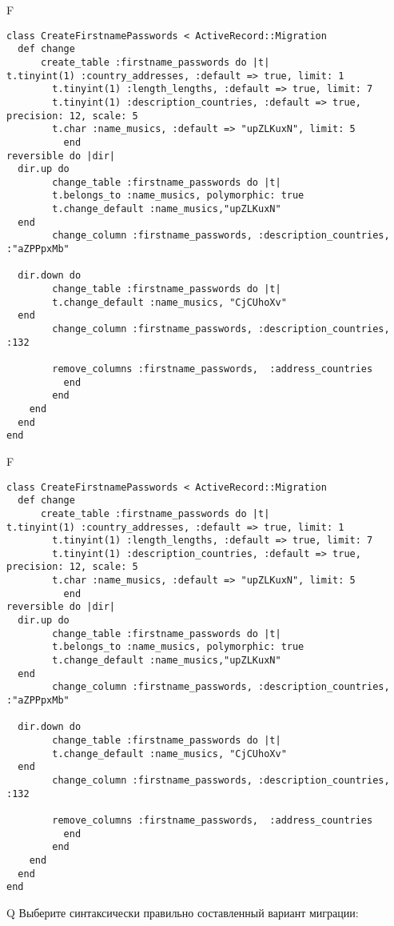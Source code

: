 F
\begin{verbatim}
class CreateFirstnamePasswords < ActiveRecord::Migration
  def change
	  create_table :firstname_passwords do |t|
t.tinyint(1) :country_addresses, :default => true, limit: 1
		t.tinyint(1) :length_lengths, :default => true, limit: 7
		t.tinyint(1) :description_countries, :default => true, precision: 12, scale: 5
		t.char :name_musics, :default => "upZLKuxN", limit: 5
		  end
reversible do |dir|
  dir.up do
		change_table :firstname_passwords do |t|
		t.belongs_to :name_musics, polymorphic: true
 		t.change_default :name_musics,"upZLKuxN"
  end
 		change_column :firstname_passwords, :description_countries, :"aZPPpxMb"
   
  dir.down do
		change_table :firstname_passwords do |t|
		t.change_default :name_musics, "CjCUhoXv"
  end
 		change_column :firstname_passwords, :description_countries, :132
   
		remove_columns :firstname_passwords,  :address_countries 
	      end
	    end
    end 
  end
end

\end{verbatim}

F
\begin{verbatim}
class CreateFirstnamePasswords < ActiveRecord::Migration
  def change
	  create_table :firstname_passwords do |t|
t.tinyint(1) :country_addresses, :default => true, limit: 1
		t.tinyint(1) :length_lengths, :default => true, limit: 7
		t.tinyint(1) :description_countries, :default => true, precision: 12, scale: 5
		t.char :name_musics, :default => "upZLKuxN", limit: 5
		  end
reversible do |dir|
  dir.up do
		change_table :firstname_passwords do |t|
		t.belongs_to :name_musics, polymorphic: true
 		t.change_default :name_musics,"upZLKuxN"
  end
 		change_column :firstname_passwords, :description_countries, :"aZPPpxMb"
   
  dir.down do
		change_table :firstname_passwords do |t|
		t.change_default :name_musics, "CjCUhoXv"
  end
 		change_column :firstname_passwords, :description_countries, :132
   
		remove_columns :firstname_passwords,  :address_countries 
	      end
	    end
    end 
  end
end

\end{verbatim}

Q
Выберите синтаксически правильно составленный вариант миграции:

